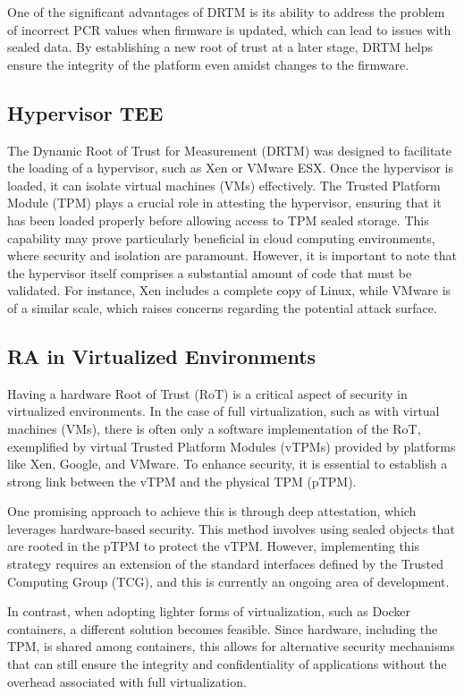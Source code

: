 One of the significant advantages of DRTM is its ability to address the problem of incorrect PCR values when firmware is updated, which can lead to issues with sealed data. By establishing a new root of trust at a later stage, DRTM helps ensure the integrity of the platform even amidst changes to the firmware.

\subsection{Hypervisor TEE}

The Dynamic Root of Trust for Measurement (DRTM) was designed to facilitate the loading of a hypervisor, such as Xen or VMware ESX. Once the hypervisor is loaded, it can isolate virtual machines (VMs) effectively. The Trusted Platform Module (TPM) plays a crucial role in attesting the hypervisor, ensuring that it has been loaded properly before allowing access to TPM sealed storage. This capability may prove particularly beneficial in cloud computing environments, where security and isolation are paramount. However, it is important to note that the hypervisor itself comprises a substantial amount of code that must be validated. For instance, Xen includes a complete copy of Linux, while VMware is of a similar scale, which raises concerns regarding the potential attack surface.

\subsection{RA in Virtualized Environments}

Having a hardware Root of Trust (RoT) is a critical aspect of security in virtualized environments. In the case of full virtualization, such as with virtual machines (VMs), there is often only a software implementation of the RoT, exemplified by virtual Trusted Platform Modules (vTPMs) provided by platforms like Xen, Google, and VMware. To enhance security, it is essential to establish a strong link between the vTPM and the physical TPM (pTPM).

One promising approach to achieve this is through deep attestation, which leverages hardware-based security. This method involves using sealed objects that are rooted in the pTPM to protect the vTPM. However, implementing this strategy requires an extension of the standard interfaces defined by the Trusted Computing Group (TCG), and this is currently an ongoing area of development.

In contrast, when adopting lighter forms of virtualization, such as Docker containers, a different solution becomes feasible. Since hardware, including the TPM, is shared among containers, this allows for alternative security mechanisms that can still ensure the integrity and confidentiality of applications without the overhead associated with full virtualization.

